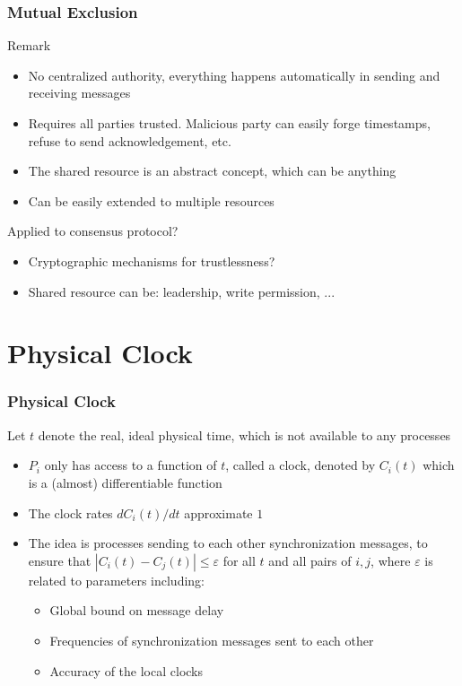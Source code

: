 \documentclass{beamer}
\begin{document}
\frame
{
  \frametitle{Mutual Exclusion}
  \begin{block}{Remark}
	  \begin{itemize}
	  	\item<2-> No centralized authority, everything happens automatically in sending and receiving messages
	  	\item<3-> Requires all parties trusted. Malicious party can easily forge timestamps, refuse to send acknowledgement, etc.
	  	\item<4-> The shared resource is an abstract concept, which can be anything
	  	\item<5-> Can be easily extended to multiple resources
	  \end{itemize}
	   Applied to consensus protocol?
	  \begin{itemize}
	  	\item<7-> Cryptographic mechanisms for trustlessness?
	  	\item<8-> Shared resource can be: leadership, write permission, ...
	  \end{itemize}
  \end{block}
}

\section{Physical Clock}
\frame
{
  \frametitle{Physical Clock}
  \onslide<+-> Let $t$ denote the real, ideal physical time, which is not available to any processes
  \begin{itemize}
  	\item<+-> $P_i$ only has access to a function of $t$, called a clock, denoted by $C_i(t)$ which is a (almost) differentiable function
  	\item<+-> The clock rates $dC_i(t)/dt$ approximate $1$
  	\item<+-> The idea is processes sending to each other synchronization messages, to ensure that $|C_i(t)-C_j(t)| \leq \varepsilon$ for all $t$ and all pairs of $i,j$, where $\varepsilon$ is related to parameters including:
  	\begin{itemize}
  		\item<+-> Global bound on message delay
  		\item<+-> Frequencies of synchronization messages sent to each other
  		\item<+-> Accuracy of the local clocks
  	\end{itemize}
  \end{itemize}
}
\end{document}
